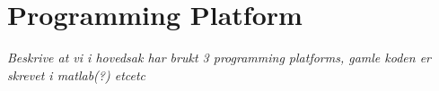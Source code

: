 \section{Programming Platform}
\label{sec:tProgrammingPlatform}
\textit{Beskrive at vi i hovedsak har brukt 3 programming platforms, gamle koden er skrevet i matlab(?) etcetc}



